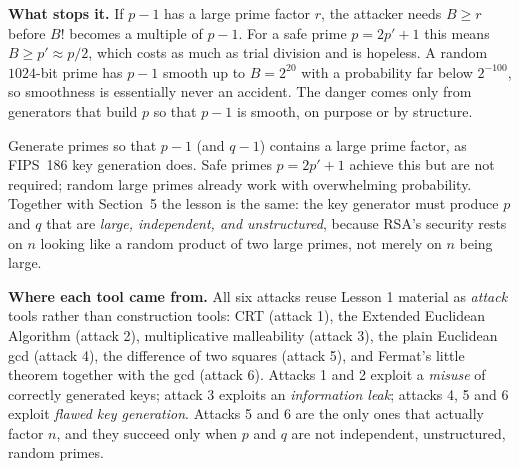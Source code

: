 \documentclass[11pt]{article}
\begin{document}
\textbf{What stops it.} If $p-1$ has a large prime factor $r$, the attacker needs $B\ge r$ before $B!$ becomes a multiple of $p-1$. For a safe prime $p=2p'+1$ this means $B\ge p'\approx p/2$, which costs as much as trial division and is hopeless. A random $1024$-bit prime has $p-1$ smooth up to $B=2^{20}$ with a probability far below $2^{-100}$, so smoothness is essentially never an accident. The danger comes only from generators that build $p$ so that $p-1$ is smooth, on purpose or by structure.

\begin{fixbox}
Generate primes so that $p-1$ (and $q-1$) contains a large prime factor, as FIPS~186 key generation does. Safe primes $p=2p'+1$ achieve this but are not required; random large primes already work with overwhelming probability. Together with Section~5 the lesson is the same: the key generator must produce $p$ and $q$ that are \emph{large, independent, and unstructured}, because RSA's security rests on $n$ looking like a random product of two large primes, not merely on $n$ being large.
\end{fixbox}

\hrulefill

\medskip
\textbf{Where each tool came from.} All six attacks reuse Lesson 1 material as \emph{attack} tools rather than construction tools: CRT (attack 1), the Extended Euclidean Algorithm (attack 2), multiplicative malleability (attack 3), the plain Euclidean gcd (attack 4), the difference of two squares (attack 5), and Fermat's little theorem together with the gcd (attack 6). Attacks 1 and 2 exploit a \emph{misuse} of correctly generated keys; attack 3 exploits an \emph{information leak}; attacks 4, 5 and 6 exploit \emph{flawed key generation}. Attacks 5 and 6 are the only ones that actually factor $n$, and they succeed only when $p$ and $q$ are not independent, unstructured, random primes.
\end{document}
